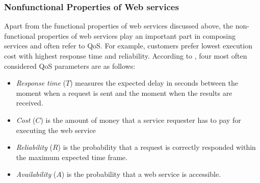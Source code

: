 
\subsubsection{Nonfunctional Properties of Web services}\label{nonfunctional}
Apart from the functional properties of web services discussed above, the non-functional properties of web services play an important part in composing services and often refer to QoS. For example, customers prefer lowest execution cost with highest response time and reliability. According to \cite{zeng2003quality}, four most often considered QoS parameters are as follows:
\begin{itemize}
\item \textit{Response time} ($T$) measures the expected delay in seconds between the moment when a request is sent and the moment when the results are received.
\item \textit{Cost} ($C$) is the amount of money that a service requester has to pay for executing the web service
\item \textit{Reliability} ($R$) is the probability that a request is correctly responded within the maximum expected time frame.
\item \textit{Availability} ($A$) is the probability that a web service is accessible.
\end{itemize}

